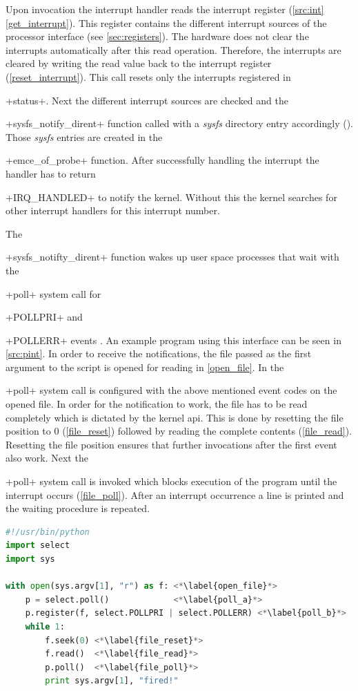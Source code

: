 \documentclass[12pt,a4paper,parskip=full,abstract=true,BCOR=12mm]{scrreprt}
\newcommand{\hack}{}
\newcommand*{\SavedLstInline}{}
\DeclareRobustCommand*{\lstinline}{%
  \ifmmode
    \let\SavedBGroup\bgroup
    \def\bgroup{%
      \let\bgroup\SavedBGroup
      \hbox\bgroup
    }%
  \fi
  \SavedLstInline
}
\def\device#1{\mbox{\textit{#1}}}
\begin{document}
Upon invocation the interrupt handler reads the interrupt register
(\cref{src:int} \cref{get_interrupt}). This register contains the
different interrupt sources of the processor interface (see
\cref{sec:registers}). The hardware does not clear the interrupts
automatically after this read operation. Therefore, the interrupts are cleared
by writing the read value back to the interrupt register
(\cref{reset_interrupt}). This call resets only the interrupts registered
in \lstinline+status+. Next the different interrupt sources are checked
and the \lstinline+sysfs_notify_dirent+ function called with a \device{sysfs}
directory entry accordingly (). Those
\device{sysfs} entries are created in the \lstinline+emce_of_probe+
function. After successfully handling the interrupt the handler has to
return \lstinline+IRQ_HANDLED+ to notify the kernel. Without this the
kernel searches for other interrupt handlers for this interrupt number.

The \lstinline+sysfs_notifty_dirent+ function wakes up user space processes
that wait with the \lstinline+poll+ system call for \lstinline+POLLPRI+ and
\lstinline+POLLERR+ events \cite{posix}. An example program using this interface
can be seen in \cref{src:pint}. In order to receive the notifications,
the file passed as the first argument to the script is opened for reading in
\cref{open_file}. In  the \lstinline+poll+ system call
is configured with the above mentioned event codes on the opened file. In order for
the notification to work, the file has to be read completely which is dictated by the kernel \gls{api}. This is done by
resetting the file position to 0 (\cref{file_reset}) followed by reading the
complete contents (\cref{file_read}). Resetting the file position ensures that
further invocations after the first event also work. Next the \lstinline+poll+
system call is invoked which blocks execution of the program until the
interrupt occurs (\cref{file_poll}). After an interrupt occurrence a line is
printed and the waiting procedure is repeated.

\begin{lstlisting}[language=python,float=htb,caption={Wait for interrupt example in Python},label=src:pint,basicstyle=\hack\scriptsize]
#!/usr/bin/python
import select
import sys

with open(sys.argv[1], "r") as f: <*\label{open_file}*>
    p = select.poll()             <*\label{poll_a}*>
    p.register(f, select.POLLPRI | select.POLLERR) <*\label{poll_b}*>
    while 1:
        f.seek(0) <*\label{file_reset}*>
        f.read()  <*\label{file_read}*>
        p.poll()  <*\label{file_poll}*>
        print sys.argv[1], "fired!"
\end{lstlisting}
\end{document}
